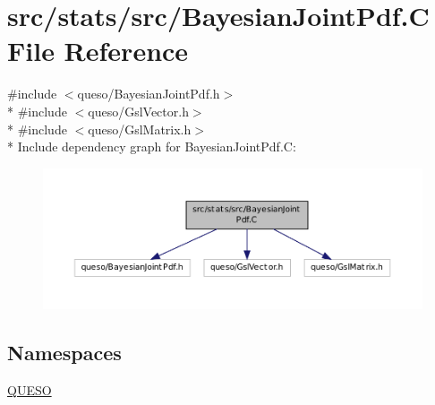 \hypertarget{_bayesian_joint_pdf_8_c}{\section{src/stats/src/\-Bayesian\-Joint\-Pdf.C File Reference}
\label{_bayesian_joint_pdf_8_c}
}
{\ttfamily \#include $<$queso/\-Bayesian\-Joint\-Pdf.\-h$>$}\\*
{\ttfamily \#include $<$queso/\-Gsl\-Vector.\-h$>$}\\*
{\ttfamily \#include $<$queso/\-Gsl\-Matrix.\-h$>$}\\*
Include dependency graph for Bayesian\-Joint\-Pdf.\-C\-:
\nopagebreak
\begin{figure}[H]
\begin{center}
\leavevmode
\includegraphics[width=350pt]{_bayesian_joint_pdf_8_c__incl}
\end{center}
\end{figure}
\subsection*{Namespaces}
\begin{DoxyCompactItemize}
\item 
\hyperlink{namespace_q_u_e_s_o}{Q\-U\-E\-S\-O}
\end{DoxyCompactItemize}

